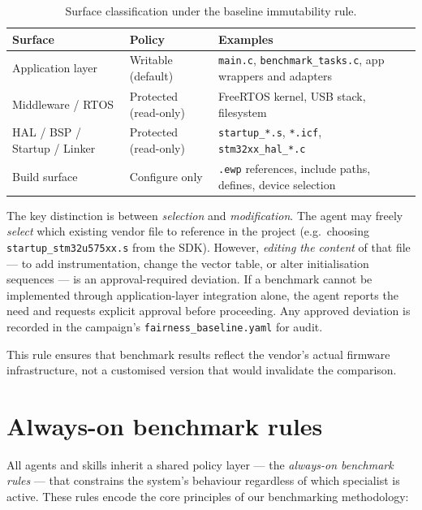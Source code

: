 \begin{table}[H]
\centering
\caption{Surface classification under the baseline immutability rule.}
\label{tab:agent-surfaces}
\begin{tabularx}{\textwidth}{l l X}
\toprule
\textbf{Surface} & \textbf{Policy} & \textbf{Examples} \\
\midrule
Application layer & Writable (default) & \texttt{main.c}, \texttt{benchmark\_tasks.c}, app wrappers and adapters \\
Middleware / RTOS & Protected (read-only) & FreeRTOS kernel, USB stack, filesystem \\
HAL / BSP / Startup / Linker & Protected (read-only) & \texttt{startup\_*.s}, \texttt{*.icf}, \texttt{stm32xx\_hal\_*.c} \\
Build surface & Configure only & \texttt{.ewp} references, include paths, defines, device selection \\
\bottomrule
\end{tabularx}
\end{table}

The key distinction is between \emph{selection} and \emph{modification}. The agent may
freely \emph{select} which existing vendor file to reference in the project (e.g.\ choosing
\texttt{startup\_stm32u575xx.s} from the SDK). However, \emph{editing the content} of that
file --- to add instrumentation, change the vector table, or alter initialisation sequences
--- is an approval-required deviation. If a benchmark cannot be implemented through
application-layer integration alone, the agent reports the need and requests explicit
approval before proceeding. Any approved deviation is recorded in the campaign's
\texttt{fairness\_baseline.yaml} for audit.

This rule ensures that benchmark results reflect the vendor's actual firmware
infrastructure, not a customised version that would invalidate the comparison.

\section{Always-on benchmark rules}
\label{sec:agent-rules}

All agents and skills inherit a shared policy layer --- the \emph{always-on benchmark
rules} --- that constrains the system's behaviour regardless of which specialist is active.
These rules encode the core principles of our benchmarking methodology:

